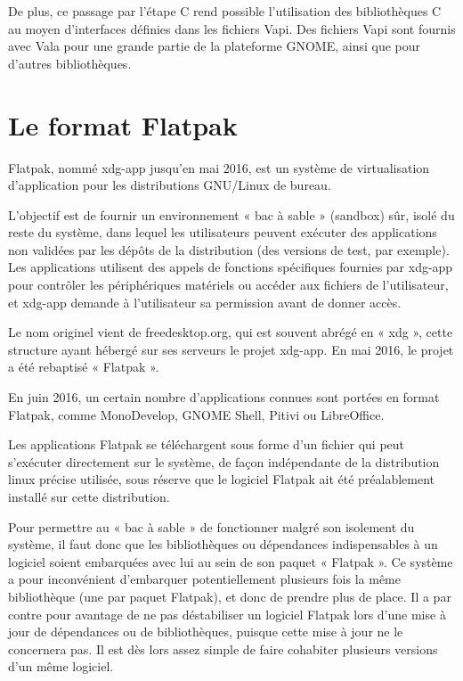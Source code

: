 \documentclass[12pt]{report}
\begin{document}
De plus, ce passage par l'étape C rend possible l'utilisation des
bibliothèques C au moyen d'interfaces définies dans les fichiers
Vapi. Des fichiers Vapi sont fournis avec Vala pour une grande partie
de la plateforme GNOME, ainsi que pour d'autres bibliothèques.

\section{Le format Flatpak}
Flatpak, nommé xdg-app jusqu’en mai 2016, est un système de
virtualisation d’application pour les distributions GNU/Linux de
bureau.

L'objectif est de fournir un environnement « bac à sable » (sandbox)
sûr, isolé du reste du système, dans lequel les utilisateurs peuvent
exécuter des applications non validées par les dépôts de la
distribution (des versions de test, par exemple). Les applications
utilisent des appels de fonctions spécifiques fournies par xdg-app
pour contrôler les périphériques matériels ou accéder aux fichiers de
l'utilisateur, et xdg-app demande à l'utilisateur sa permission avant
de donner accès.

Le nom originel vient de freedesktop.org, qui est souvent abrégé en «
xdg », cette structure ayant hébergé sur ses serveurs le projet
xdg-app. En mai 2016, le projet a été rebaptisé « Flatpak ».

En juin 2016, un certain nombre d'applications connues sont portées en
format Flatpak, comme MonoDevelop, GNOME Shell, Pitivi ou LibreOffice.

Les applications Flatpak se téléchargent sous forme d'un fichier qui
peut s’exécuter directement sur le système, de façon indépendante de
la distribution linux précise utilisée, sous réserve que le logiciel
Flatpak ait été préalablement installé sur cette distribution.

Pour permettre au « bac à sable » de fonctionner malgré son isolement
du système, il faut donc que les bibliothèques ou dépendances
indispensables à un logiciel soient embarquées avec lui au sein de son
paquet « Flatpak ». Ce système a pour inconvénient d'embarquer
potentiellement plusieurs fois la même bibliothèque (une par paquet
Flatpak), et donc de prendre plus de place. Il a par contre pour
avantage de ne pas déstabiliser un logiciel Flatpak lors d'une mise à
jour de dépendances ou de bibliothèques, puisque cette mise à jour ne
le concernera pas. Il est dès lors assez simple de faire cohabiter
plusieurs versions d'un même logiciel.
\end{document}
